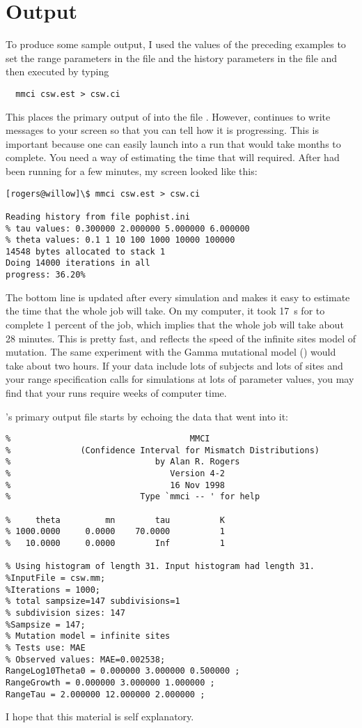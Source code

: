 \section{Output}

To produce some sample output, I used the values of the preceding
examples to set the range parameters in the file
 and the history parameters in the file 
and then executed  by typing
\begin{verbatim}
  mmci csw.est > csw.ci
\end{verbatim}
This places the primary output of  into the file .
However,  continues to write messages to your screen so that
you can tell how it is progressing.  This is important because one can
easily launch  into a run that would take months to complete.
You need a way of estimating the time that will required.  After
 had been running for a few minutes, my screen looked like
this: 
\begin{verbatim}
[rogers@willow]\$ mmci csw.est > csw.ci

Reading history from file pophist.ini
% tau values: 0.300000 2.000000 5.000000 6.000000
% theta values: 0.1 1 10 100 1000 10000 100000
14548 bytes allocated to stack 1
Doing 14000 iterations in all
progress: 36.20%
\end{verbatim}
The bottom line is updated after every simulation and makes it easy to
estimate the time that the whole job will take.  On my computer, it
took 17~s for  to complete 1 percent of the job, which
implies that the whole job will take about 28 minutes.  This is pretty
fast, and reflects the speed of the infinite sites model of mutation.
The same experiment with the Gamma mutational model 
() would take about two hours.  If your data include
lots of subjects and lots of sites and your range specification calls
for simulations at lots of parameter values, you may find that your
runs require weeks of computer time.

's primary output file starts by echoing the data that went
into it:
\begin{verbatim}
%                                    MMCI
%              (Confidence Interval for Mismatch Distributions)
%                             by Alan R. Rogers
%                                Version 4-2
%                                16 Nov 1998
%                          Type `mmci -- ' for help

%     theta         mn        tau          K
% 1000.0000     0.0000    70.0000          1
%   10.0000     0.0000        Inf          1

% Using histogram of length 31. Input histogram had length 31.
%InputFile = csw.mm;
%Iterations = 1000;
% total sampsize=147 subdivisions=1
% subdivision sizes: 147
%Sampsize = 147;
% Mutation model = infinite sites
% Tests use: MAE
% Observed values: MAE=0.002538;
RangeLog10Theta0 = 0.000000 3.000000 0.500000 ;
RangeGrowth = 0.000000 3.000000 1.000000 ;
RangeTau = 2.000000 12.000000 2.000000 ;
\end{verbatim}
I hope that this material is self explanatory.


